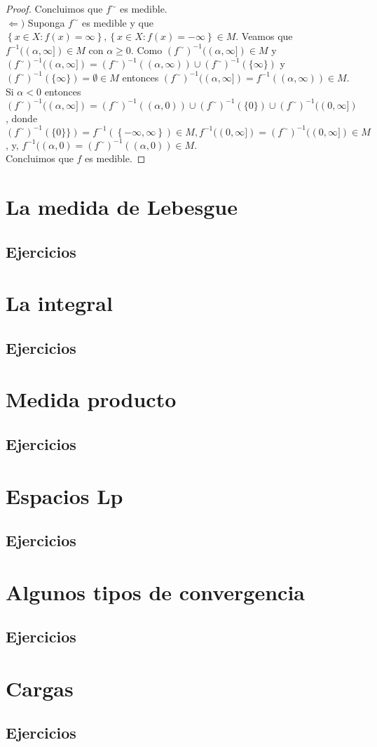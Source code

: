 \documentclass[spanish,12pt,a4paper,openany]{book}
\begin{document}
\begin{enumerate}
\begin{proof}
			Concluimos que $f^{\sim}$ es medible.\\
			
			$\Leftarrow )$ Suponga $f^{\sim}$ es medible y que $\left\{x \in X : f(x) = \infty \right\} , \left\{x \in X : f (x) = - \infty \right\} \in M$. Veamos que $f^{-1}((\alpha, \infty]) \in M$ con $\alpha \geq 0$.  Como $(f^{\sim}) ^{-1} ((\alpha , \infty]) \in M $ y $(f^{\sim}) ^{-1} ((\alpha , \infty]) = (f^{\sim}) ^{-1} ((\alpha , \infty)) \cup (f^{\sim}) ^{-1} (\{ \infty \})$ y $(f^{\sim}) ^{-1} (\{ \infty \}) = \emptyset \in M$ entonces $(f^{\sim}) ^{-1} ((\alpha , \infty]) = f^{-1} ((\alpha , \infty)) \in M$.\\
			
			Si $\alpha < 0$ entonces $(f^{\sim}) ^{-1} ((\alpha , \infty]) = (f^{\sim}) ^{-1} ((\alpha , 0)) \cup (f^{\sim}) ^{-1} ( \{ 0 \} ) \cup (f^{\sim}) ^{-1} ((0, \infty])$, donde $(f^{\sim}) ^{-1} ( \{ 0 \} \}) = f^{-1}(\left\{- \infty, \infty \right\}) \in M, f ^{-1} ((0, \infty]) = (f^{\sim}) ^{-1} ((0, \infty]) \in M $, y,  $f^{-1} ((\alpha, 0) = (f^{\sim})^{-1} ((\alpha, 0)) \in M$.\\
			
			Concluimos que $f$ es medible.
		\end{proof}
	\end{enumerate}
	\chapter{La medida de Lebesgue}
	\section{Ejercicios}
	\chapter{La integral}
	\section{Ejercicios}
	\chapter{Medida producto}
	\section{Ejercicios}
	\chapter{Espacios Lp}
	\section{Ejercicios}
	\chapter{Algunos tipos de convergencia}
	\section{Ejercicios}
	\chapter{Cargas}
	\section{Ejercicios}
	
\end{document}
